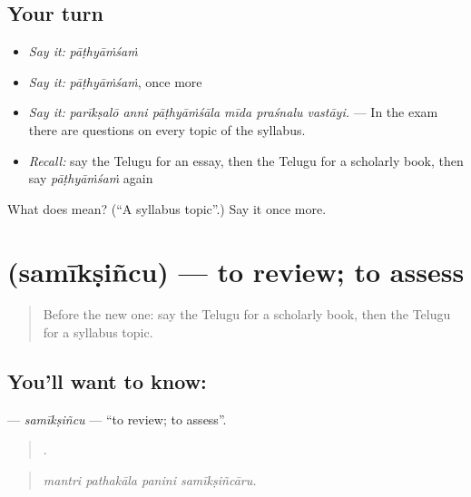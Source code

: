\subsection*{Your turn}
\begin{itemize}
\raggedright
  \item \emph{Say it:} \emph{pāṭhyāṁśaṁ}
  \item \emph{Say it:} \emph{pāṭhyāṁśaṁ}, once more
  \item \emph{Say it:} \emph{parīkṣalō anni pāṭhyāṁśāla mīda praśnalu vastāyi.} — In the exam there are questions on every topic of the syllabus.
  \item \emph{Recall:} say the Telugu for an essay, then the Telugu for a scholarly book, then say \emph{pāṭhyāṁśaṁ} again
\end{itemize}

\begin{tcolorbox}[breakable,colback=teal!4,colframe=teal!35!black,title={Before you move on}]
What does  mean? (\textquotedblleft{}A syllabus topic\textquotedblright{}.) Say it once more.
\end{tcolorbox}
\section[\texorpdfstring{\te{సమీక్షించు} (samīkṣiñcu)}{సమీక్షించు (samīkṣiñcu)}]{ (samīkṣiñcu) — to review; to assess}

\label{lesson:TE-C416-samiksincu}



\begin{quote}
Before the new one: say the Telugu for a scholarly book, then the Telugu for a syllabus topic.
\end{quote}

\subsection*{You'll want to know: }
\textbf{} — \emph{samīkṣiñcu} — \textquotedblleft{}to review; to assess\textquotedblright{}.

\begin{quote}
   .
\end{quote}

\begin{quote}
\emph{mantri pathakāla panini samīkṣiñcāru.}
\end{quote}

